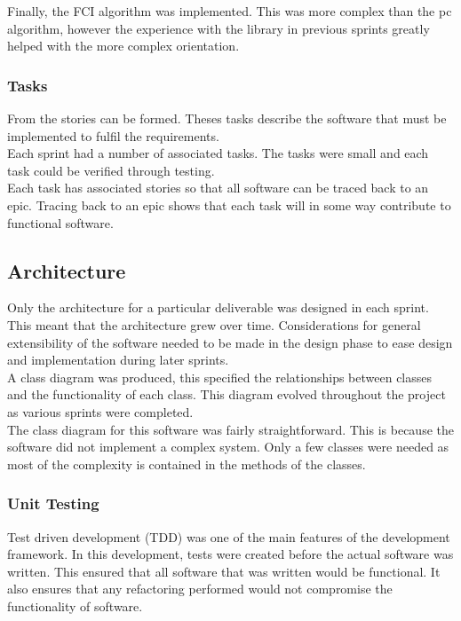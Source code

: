 \documentclass{article}
\begin{document}
Finally, the FCI algorithm was implemented. This was more complex than the pc algorithm, however the experience with the library in previous sprints greatly helped with the more complex orientation.\\

\subsubsection{Tasks}
From the stories can be formed. Theses tasks describe the software that must be implemented to fulfil the requirements. \\

Each sprint had a number of associated tasks. The tasks were small and each task could be verified through testing.\\

Each task has associated stories so that all software can be traced back to an epic. Tracing back to an epic shows that each task will in some way contribute to functional software.\\
\subsection{Architecture}
Only the architecture for a particular deliverable was designed in each sprint. This meant that the architecture grew over time. Considerations for general extensibility of the software needed to be made in the design phase to ease design and implementation during later sprints.\\

A class diagram was produced, this specified the relationships between classes and the functionality of each class. This diagram evolved throughout the project as various sprints were completed.\\

The class diagram for this software was fairly straightforward. This is because the software did not implement a complex system. Only a few classes were needed as most of the complexity is contained in the methods of the classes.

\subsubsection{Unit Testing}
Test driven development (TDD) was one of the main features of the development framework. In this development, tests were created before the actual software was written. This ensured that all software that was written would be functional. It also ensures that any refactoring performed would not compromise the functionality of software.\\
\end{document}
